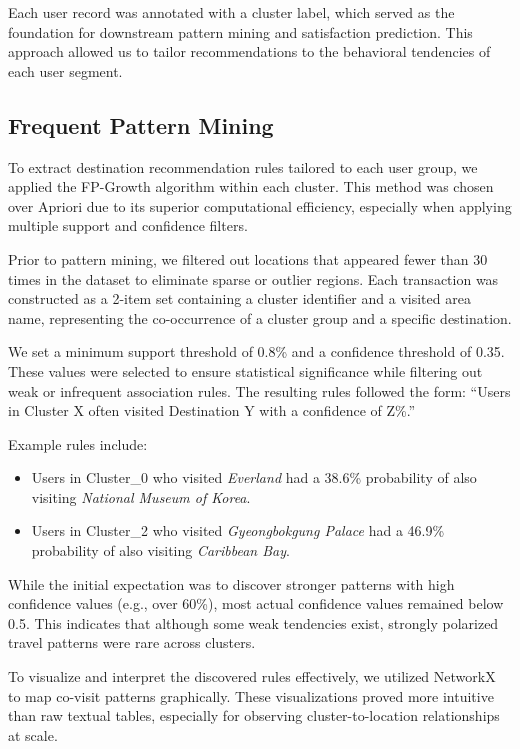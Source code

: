 \documentclass[sigconf]{acmart}
\begin{document}
Each user record was annotated with a cluster label, which served as the foundation for downstream pattern mining and satisfaction prediction. This approach allowed us to tailor recommendations to the behavioral tendencies of each user segment.


\subsection{Frequent Pattern Mining}

To extract destination recommendation rules tailored to each user group, we applied the FP-Growth algorithm within each cluster. This method was chosen over Apriori due to its superior computational efficiency, especially when applying multiple support and confidence filters.

Prior to pattern mining, we filtered out locations that appeared fewer than 30 times in the dataset to eliminate sparse or outlier regions. Each transaction was constructed as a 2-item set containing a cluster identifier and a visited area name, representing the co-occurrence of a cluster group and a specific destination.

We set a minimum support threshold of 0.8\% and a confidence threshold of 0.35. These values were selected to ensure statistical significance while filtering out weak or infrequent association rules. The resulting rules followed the form: “Users in Cluster X often visited Destination Y with a confidence of Z\%.”

Example rules include:
\begin{itemize}
  \item Users in Cluster\_0 who visited \textit{Everland} had a 38.6\% probability of also visiting \textit{National Museum of Korea}.
  \item Users in Cluster\_2 who visited \textit{Gyeongbokgung Palace} had a 46.9\% probability of also visiting \textit{Caribbean Bay}.
\end{itemize}

While the initial expectation was to discover stronger patterns with high confidence values (e.g., over 60\%), most actual confidence values remained below 0.5. This indicates that although some weak tendencies exist, strongly polarized travel patterns were rare across clusters.

To visualize and interpret the discovered rules effectively, we utilized NetworkX to map co-visit patterns graphically. These visualizations proved more intuitive than raw textual tables, especially for observing cluster-to-location relationships at scale.
\end{document}
